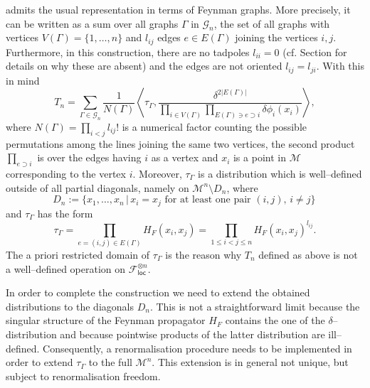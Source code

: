 \documentclass[10pt]{book}
\newcommand{\loc}{\mathsf{loc}}
\newcommand{\Mcal}{\mathcal{M}}
\theoremstyle{break}
\begin{document}
admits the usual representation in terms of Feynman graphs. More precisely, it can be written as a sum over all graphs $\Gamma$ in $\mathcal{G}_n$, the set of all graphs with vertices $V(\Gamma)= \{ 1,\dots, n\}$ and $l_{ij}$ edges $e\in E(\Gamma)$  joining the vertices $i,j$. Furthermore, in this construction, there are no tadpoles $l_{ii}=0$ (cf. Section %
for details on why these are absent) and the edges are not oriented $l_{ij}=l_{ji}$. With this in mind 
\begin{equation*}
T_n = \sum_{\Gamma\in \mathcal{G}_n}  \frac{1}{N(\Gamma)}    \left\langle  \tau_\Gamma  , \frac{\delta^{2|E(\Gamma)|}}{  \prod_{i \in V(\Gamma)} \prod_{E(\Gamma)\ni e \supset i}    \delta \phi_i(x_{i}) } \right\rangle,
\end{equation*}
where $N(\Gamma)= \prod_{i<j} l_{ij}! $ is a numerical factor counting the possible permutations among the lines joining the same two vertices, the second product $\prod_{e \supset i} $ is over the edges having $i$ as a vertex and $x_{i}$ is a point in $\Mcal$ corresponding to the vertex $i$.
Moreover, $\tau_\Gamma$  is a distribution which is well--defined outside of all partial diagonals, namely on
$\Mcal^n\setminus D_n$, where 
%
\begin{equation*}
D_n:=\{x_1,\ldots,x_n\,|\, x_i=x_j \text{ for at least one pair } (i,j),\, i\neq j \}\,
\end{equation*}
%
and $\tau_\Gamma$ has the form
%
\begin{equation*}
\tau_\Gamma = \prod_{e=(i,j)\in E(\Gamma)} H_F(x_{i},x_{j})=\prod_{1\le i<j\le n} H_F(x_{i},x_{j})^{l_{ij}}.
\end{equation*}
%
The a priori restricted domain of $\tau_\Gamma$ is the reason why $T_n$ defined as above is not a well--defined operation on $\mathcal{F}_\loc^{\otimes n}$.

In order to complete the construction we need to extend the obtained distributions to the diagonals $D_n$. This is not a straightforward limit because the singular structure of the Feynman propagator $H_F$ contains the one of the $\delta$--distribution and because pointwise products of the latter distribution are ill--defined. Consequently, a renormalisation procedure needs to be implemented in order to extend $\tau_\Gamma$ to the full $\Mcal^n$. This extension is in general not unique, but subject to renormalisation freedom.
\end{document}
